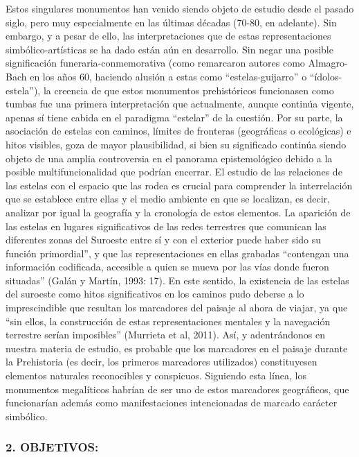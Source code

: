 \documentclass[
]{article}
\begin{document}
Estos singulares monumentos han venido siendo objeto de estudio desde el
pasado siglo, pero muy especialmente en las últimas décadas (70-80, en
adelante). Sin embargo, y a pesar de ello, las interpretaciones que de
estas representaciones simbólico-artísticas se ha dado están aún en
desarrollo. Sin negar una posible significación funeraria-conmemorativa
(como remarcaron autores como Almagro-Bach en los años 60, haciendo
alusión a estas como ``estelas-guijarro'' o ``ídolos-estela''), la
creencia de que estos monumentos prehistóricos funcionasen como tumbas
fue una primera interpretación que actualmente, aunque continúa vigente,
apenas sí tiene cabida en el paradigma ``estelar'' de la cuestión. Por
su parte, la asociación de estelas con caminos, límites de fronteras
(geográficas o ecológicas) e hitos visibles, goza de mayor
plausibilidad, si bien su significado continúa siendo objeto de una
amplia controversia en el panorama epistemológico debido a la posible
multifuncionalidad que podrían encerrar. El estudio de las relaciones de
las estelas con el espacio que las rodea es crucial para comprender la
interrelación que se establece entre ellas y el medio ambiente en que se
localizan, es decir, analizar por igual la geografía y la cronología de
estos elementos. La aparición de las estelas en lugares significativos
de las redes terrestres que comunican las diferentes zonas del Suroeste
entre sí y con el exterior puede haber sido su función primordial'', y
que las representaciones en ellas grabadas ``contengan una información
codificada, accesible a quien se mueva por las vías donde fueron
situadas'' (Galán y Martín, 1993: 17). En este sentido, la existencia de
las estelas del suroeste como hitos significativos en los caminos pudo
deberse a lo imprescindible que resultan los marcadores del paisaje al
ahora de viajar, ya que ``sin ellos, la construcción de estas
representaciones mentales y la navegación terrestre serían imposibles''
(Murrieta et al, 2011). Así, y adentrándonos en nuestra materia de
estudio, es probable que los marcadores en el paisaje durante la
Prehistoria (es decir, los primeros marcadores utilizados) constituyesen
elementos naturales reconocibles y conspicuos. Siguiendo esta línea, los
monumentos megalíticos habrían de ser uno de estos marcadores
geográficos, que funcionarían además como manifestaciones intencionadas
de marcado carácter simbólico.

\hypertarget{objetivos}{%
\subsubsection{2. OBJETIVOS:}\label{objetivos}}
\end{document}
